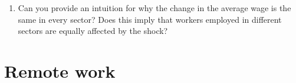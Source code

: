 \documentclass[12pt,oneside,reqno]{amsart}
\begin{document}
\begin{enumerate}[leftmargin=15pt,label=\textbf{\roman*.}]
\item Can you provide an intuition for why the change in the average wage is the same in every sector? Does this imply that workers employed in different sectors are equally affected by the shock? 
\end{enumerate}

\clearpage

\section{Remote work}
\end{document}
